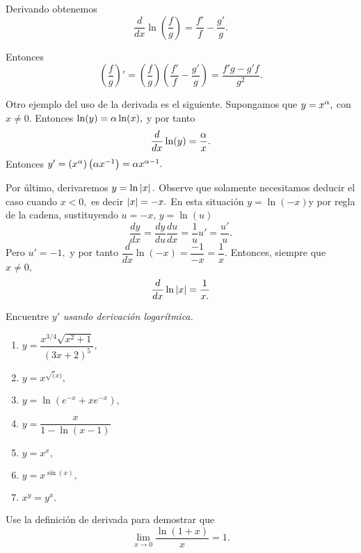     Derivando obtenemos
    $$
    \dfrac{d}{dx} \ln\left( \dfrac{f}{g} \right)=\dfrac{f'}{f}-\dfrac{g'}{g}.
    $$



    Entonces
    $$\left( \dfrac{f}{g} \right)'=\left( \dfrac{f}{g} \right)\left( \dfrac{f'}{f}-\dfrac{g'}{g}
    \right)=\dfrac{f'g-g'f}{g^{2}}.
    $$


    
    Otro ejemplo del uso de la derivada es el siguiente. Supongamos que $y=x^{\alpha},$ con $x\neq0.$ Entonces
    $
    \ln(y)=\alpha\ln(x),
    $
    y por tanto
    $$
    \dfrac{d}{dx}\ln(y)=\dfrac{\alpha}{x}.
    $$
    Entonces
    $y'=\left( x^{\alpha} \right)\left( \alpha x^{-1} \right)=\alpha x^{\alpha-1}.$


    
    Por último, derivaremos $y=\ln\left|x\right|.$ Observe que solamente necesitamos deducir el caso cuando $x<0,$ es decir
    $\left|x\right|=-x.$ En esta situación $y=\ln(-x)$y por regla de la cadena, sustituyendo $u=-x, \, y=\ln(u)$
    $$
    \dfrac{dy}{dx}=\dfrac{dy}{du}\dfrac{du}{dx}=\dfrac{1}{u}u'=\dfrac{u'}{u}.$$
    Pero $u'=-1, $ y por tanto $\dfrac{d}{dx}\ln(-x)=\dfrac{-1}{-x}=\dfrac{1}{x}.$ Entonces, siempre que $x\neq 0,$
    $$
    \dfrac{d}{dx}\ln\left|x\right|=\dfrac{1}{x.}
    $$




    \begin{problema}
        Encuentre $y'$ \emph{usando derivación logarítmica.}
        \begin{enumerate}
            \item $y=\dfrac{x^{3/4}\sqrt{x^{2}+1}}{(3x+2)^{5}},$
            \item $y=x^{\sqrt(x)},$
            \item $y=\ln(e^{-x}+xe^{-x}),$
            \item $y=\dfrac{x}{1-\ln(x-1)}$
            \item $y=x^{x},$
            \item $y=x^{\sin(x)},$
            \item $x^{y}=y^{x}.$
        \end{enumerate}
        
    \end{problema}


    \begin{problema}
        Use la definición de derivada para demostrar que
        $$
        \lim_{x\to 0}\dfrac{\ln(1+x)}{x}=1.
        $$
    \end{problema}

